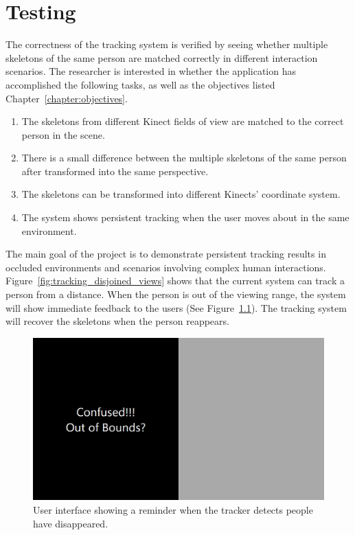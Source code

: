 


\chapter{Testing}

\label{chapter:testing}

The correctness of the tracking system is verified by seeing whether multiple skeletons of the same person are matched correctly in different interaction scenarios. The researcher is interested in whether the application has accomplished the following tasks, as well as the objectives listed Chapter~\ref{chapter:objectives}.

\begin{enumerate}
  \item The skeletons from different Kinect fields of view are matched to the correct person in the scene.
  \item There is a small difference between the multiple skeletons of the same person after transformed into the same perspective.
  \item The skeletons can be transformed into different Kinects' coordinate system.
  \item The system shows persistent tracking when the user moves about in the same environment.
\end{enumerate}

The main goal of the project is to demonstrate persistent tracking results in occluded environments and scenarios involving complex human interactions. Figure~\ref{fig:tracking_disjoined_views} shows that the current system can track a person from a distance. When the person is out of the viewing range, the system will show immediate feedback to the users (See Figure~\ref{fig:tracking_confused}). The tracking system will recover the skeletons when the person reappears.

\begin{figure}[!h]
  \centering
  
  \includegraphics[width=0.5\linewidth]{figs/confused}

  \caption{User interface showing a reminder when the tracker detects people have disappeared.}
  
  \label{fig:tracking_confused}
\end{figure}

